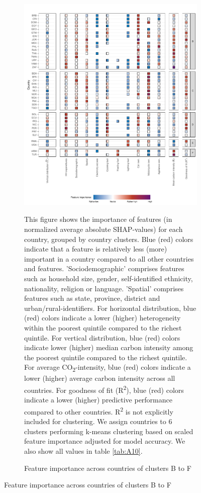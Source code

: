 \documentclass[12pt, a4paper]{article}
\newenvironment{subcaption2}
{\strut
\vspace{-5pt}
\begin{minipage}[b]{0.9\textwidth}
  \hspace*{-\parindent}
  \footnotesize}
 {\end{minipage}}
\begin{document}
\clearpage

\clearpage
\begin{figure}[ht!]\ContinuedFloat
    \centering
    \begin{subfigure}[b]{\textwidth}
    \centering
    \caption{Feature importance across countries of clusters B to F}\label{fig:fig_4_2}
    \includegraphics{Figure 4/Figure_4_Corrected_2}
    \begin{subcaption2}
    This figure shows the importance of features (in normalized average absolute SHAP-values) for each country, grouped by country clusters. Blue (red) colors indicate that a feature is relatively less (more) important in a country compared to all other countries and features. 'Sociodemographic' comprises features such as household size, gender, self-identified ethnicity, nationality, religion or language. 'Spatial' comprises features such as state, province, district and urban/rural-identifiers. For horizontal distribution, blue (red) colors indicate a lower (higher) heterogeneity within the poorest quintile compared to the richest quintile. For vertical distribution, blue (red) colors indicate lower (higher) median carbon intensity among the poorest quintile compared to the richest quintile. For average CO\textsubscript{2}-intensity, blue (red) colors indicate a lower (higher) average carbon intensity across all countries. For goodness of fit (R\textsuperscript{2}), blue (red) colors indicate a lower (higher) predictive performance compared to other countries. R\textsuperscript{2} is not explicitly included for clustering.
    We assign countries to 6 clusters performing k-means clustering based on scaled feature importance adjusted for model accuracy. We also show all values in table \ref{tab:A10}.
    \end{subcaption2}
    \end{subfigure}
    

\end{figure}
\end{document}

